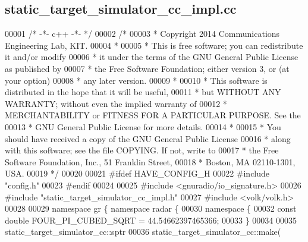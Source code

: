 \subsection{static\+\_\+target\+\_\+simulator\+\_\+cc\+\_\+impl.\+cc}
\label{static__target__simulator__cc__impl_8cc_source}

\begin{DoxyCode}
00001 \textcolor{comment}{/* -*- c++ -*- */}
00002 \textcolor{comment}{/*}
00003 \textcolor{comment}{ * Copyright 2014 Communications Engineering Lab, KIT.}
00004 \textcolor{comment}{ *}
00005 \textcolor{comment}{ * This is free software; you can redistribute it and/or modify}
00006 \textcolor{comment}{ * it under the terms of the GNU General Public License as published by}
00007 \textcolor{comment}{ * the Free Software Foundation; either version 3, or (at your option)}
00008 \textcolor{comment}{ * any later version.}
00009 \textcolor{comment}{ *}
00010 \textcolor{comment}{ * This software is distributed in the hope that it will be useful,}
00011 \textcolor{comment}{ * but WITHOUT ANY WARRANTY; without even the implied warranty of}
00012 \textcolor{comment}{ * MERCHANTABILITY or FITNESS FOR A PARTICULAR PURPOSE.  See the}
00013 \textcolor{comment}{ * GNU General Public License for more details.}
00014 \textcolor{comment}{ *}
00015 \textcolor{comment}{ * You should have received a copy of the GNU General Public License}
00016 \textcolor{comment}{ * along with this software; see the file COPYING.  If not, write to}
00017 \textcolor{comment}{ * the Free Software Foundation, Inc., 51 Franklin Street,}
00018 \textcolor{comment}{ * Boston, MA 02110-1301, USA.}
00019 \textcolor{comment}{ */}
00020 
00021 \textcolor{preprocessor}{#ifdef HAVE\_CONFIG\_H}
00022 \textcolor{preprocessor}{#include "config.h"}
00023 \textcolor{preprocessor}{#endif}
00024 
00025 \textcolor{preprocessor}{#include <gnuradio/io\_signature.h>}
00026 \textcolor{preprocessor}{#include "static_target_simulator_cc_impl.h"}
00027 \textcolor{preprocessor}{#include <volk/volk.h>}
00028 
00029 \textcolor{keyword}{namespace }gr \{ \textcolor{keyword}{namespace }radar \{
00030     \textcolor{keyword}{namespace }\{
00032         \textcolor{keyword}{const} \textcolor{keywordtype}{double} FOUR\_PI\_CUBED\_SQRT = 44.54662397465366;
00033     \}
00034 
00035     static_target_simulator_cc::sptr
00036     static_target_simulator_cc::make(

\end{DoxyCode}

